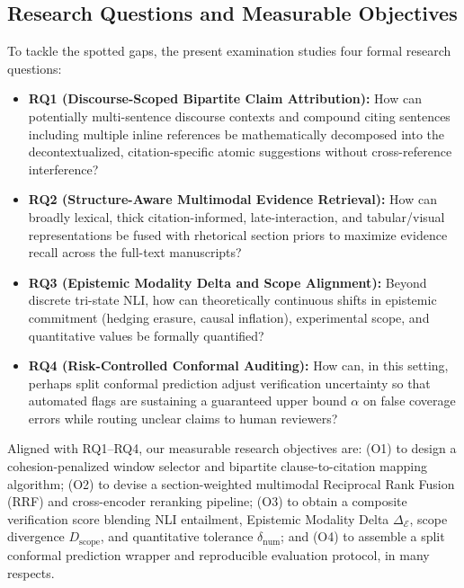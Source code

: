 \documentclass[journal]{IEEEtran}
\begin{document}
\subsection{Research Questions and Measurable Objectives}
To tackle the spotted gaps, the present examination studies four formal research questions:
\begin{itemize}
\item \textbf{RQ1 (Discourse-Scoped Bipartite Claim Attribution):} How can potentially multi-sentence discourse contexts and compound citing sentences including multiple inline references be mathematically decomposed into the decontextualized, citation-specific atomic suggestions without cross-reference interference?
\item \textbf{RQ2 (Structure-Aware Multimodal Evidence Retrieval):} How can broadly lexical, thick citation-informed, late-interaction, and tabular/visual representations be fused with rhetorical section priors to maximize evidence recall across the full-text manuscripts?
\item \textbf{RQ3 (Epistemic Modality Delta and Scope Alignment):} Beyond discrete tri-state NLI, how can theoretically continuous shifts in epistemic commitment (hedging erasure, causal inflation), experimental scope, and quantitative values be formally quantified?
\item \textbf{RQ4 (Risk-Controlled Conformal Auditing):} How can, in this setting, perhaps split conformal prediction adjust verification uncertainty so that automated flags are sustaining a guaranteed upper bound $\alpha$ on false coverage errors while routing unclear claims to human reviewers?
\end{itemize}

Aligned with RQ1--RQ4, our measurable research objectives are: (O1) to design a cohesion-penalized window selector and bipartite clause-to-citation mapping algorithm; (O2) to devise a section-weighted multimodal Reciprocal Rank Fusion (RRF) and cross-encoder reranking pipeline; (O3) to obtain a composite verification score blending NLI entailment, Epistemic Modality Delta $\Delta_{\mathcal{E}}$, scope divergence $D_{\text{scope}}$, and quantitative tolerance $\delta_{\text{num}}$; and (O4) to assemble a split conformal prediction wrapper and reproducible evaluation protocol, in many respects.
\end{document}
